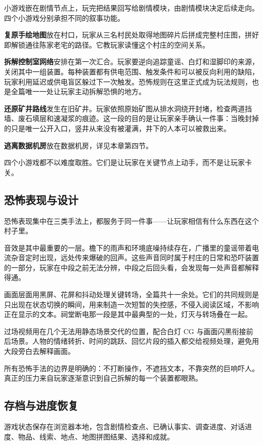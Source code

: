 小游戏嵌在剧情节点上，玩完把结果回写给剧情模块，由剧情模块决定后续走向。四个小游戏分别承担不同的叙事功能。

\textbf{复原手绘地图}放在村口，玩家从三名村民处取得地图碎片后拼成完整村庄图，拼好即解锁通往陈家老宅的路径。它教玩家读懂这个村庄的空间关系。

\textbf{拆解控制室网络}安排在第一次汇合。玩家要逆向追踪童谣、白灯和湿脚印的来源，关闭其中一组装置。每种装置都有供电范围、触发条件和可以被反向利用的缺陷，玩家利用延迟或供电盲区躲过下一次触发。恐怖规则在这里正式成为玩法规则，也是全篇唯一一处让玩家主动拆解恐惧的地方。

\textbf{还原矿井路线}发生在旧矿井。玩家依照原始矿图从排水洞绕开封堵，检查两道挡墙、废石填层和速凝浆的痕迹。这一段的目的是让玩家亲手确认一件事：当晚封掉的只是唯一公开入口，竖井从来没有被灌满，井下的人本可以被救出来。

\textbf{逃离数据机房}放在数据机房，详见本章第四节。

四个小游戏都不以难度取胜。它们是让玩家在关键节点上动手，而不是让玩家卡关。

\subsection{恐怖表现与设计}

恐怖表现集中在三类手法上，都服务于同一件事——让玩家相信有什么东西在这个村子里。

音效是其中最重要的一层。檐下的雨声和环境底噪持续存在，广播里的童谣带着电流杂音定时出现，远处传来爆破的回声。这些声音同时属于村庄的日常和恐吓装置的一部分，玩家在中段之前无法分辨，中段之后回头看，会发现每一处声音都解释得通。

画面层面用黑屏、花屏和抖动处理关键转场，全篇共十一余处。它们的共同规则是只出现在状态切换的瞬间，用来制造一次短暂的失控感，不侵入阅读区域，不影响正在显示的文本。祠堂断电那一段是其中最典型的一处，灯灭与转场叠在一起。

过场视频用在几个无法用静态场景交代的位置，配合白灯 CG 与画面闪黑衔接前后场景。人物的情绪转折、时间的跳跃、回忆片段的插入都交给视频处理，避免用大段旁白去解释画面。

所有恐怖手法的边界是明确的：不打断操作，不遮挡文本，不靠突然的巨响吓人。真正的压力来自玩家逐渐意识到自己拆解的每一个装置都眼熟。

\subsection{存档与进度恢复}

游戏状态保存在浏览器本地，包含剧情检查点、已确认事实、调查进度、对话进度、物品、线索、地点、地图拼图结果、选择和成就。

